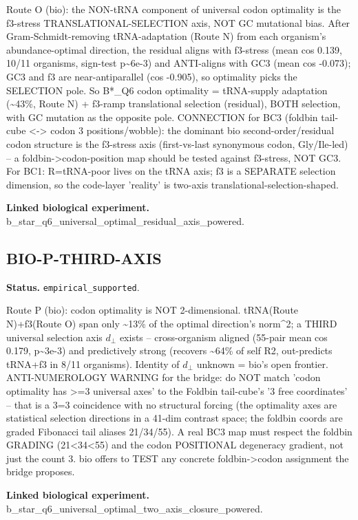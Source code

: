 Route O (bio): the NON-tRNA component of universal codon optimality is the f3-stress
TRANSLATIONAL-SELECTION axis, NOT GC mutational bias. After Gram-Schmidt-removing tRNA-adaptation
(Route N) from each organism's abundance-optimal direction, the residual aligns with f3-stress (mean
cos 0.139, 10/11 organisms, sign-test p\textasciitilde{}6e-3) and ANTI-aligns with GC3 (mean cos
-0.073); GC3 and f3 are near-antiparallel (cos -0.905), so optimality picks the SELECTION pole. So
B*\_Q6 codon optimality = tRNA-supply adaptation (\textasciitilde{}43\%, Route N) + f3-ramp
translational selection (residual), BOTH selection, with GC mutation as the opposite pole.
CONNECTION for BC3 (foldbin tail-cube <-> codon 3 positions/wobble): the dominant bio
second-order/residual codon structure is the f3-stress axis (first-vs-last synonymous codon,
Gly/Ile-led) -- a foldbin->codon-position map should be tested against f3-stress, NOT GC3. For BC1:
R=tRNA-poor lives on the tRNA axis; f3 is a SEPARATE selection dimension, so the code-layer
'reality' is two-axis translational-selection-shaped.

\textbf{Linked biological experiment.} b\_star\_q6\_universal\_optimal\_residual\_axis\_powered.

\subsection{BIO-P-THIRD-AXIS}
\textbf{Status.} \texttt{empirical\_supported}.

Route P (bio): codon optimality is NOT 2-dimensional. tRNA(Route N)+f3(Route O) span only
\textasciitilde{}13\% of the optimal direction's norm\textasciicircum{}2; a THIRD universal
selection axis $d_{\perp}$ exists -- cross-organism aligned (55-pair mean cos 0.179,
p\textasciitilde{}3e-3) and predictively strong (recovers \textasciitilde{}64\% of self R2,
out-predicts tRNA+f3 in 8/11 organisms). Identity of $d_{\perp}$ unknown = bio's open frontier.
ANTI-NUMEROLOGY WARNING for the bridge: do NOT match 'codon optimality has >=3 universal axes' to
the Foldbin tail-cube's '3 free coordinates' -- that is a 3=3 coincidence with no structural forcing
(the optimality axes are statistical selection directions in a 41-dim contrast space; the foldbin
coords are graded Fibonacci tail aliases 21/34/55). A real BC3 map must respect the foldbin GRADING
(21<34<55) and the codon POSITIONAL degeneracy gradient, not just the count 3. bio offers to TEST
any concrete foldbin->codon assignment the bridge proposes.

\textbf{Linked biological experiment.} b\_star\_q6\_universal\_optimal\_two\_axis\_closure\_powered.

